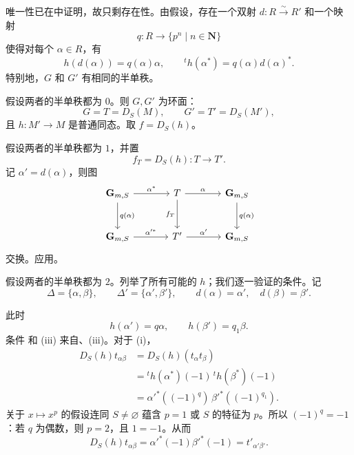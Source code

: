 


唯一性已在中证明，故只剩存在性。由假设，存在一个双射 \(d:R\xrightarrow{\sim}R'\) 和一个映射
\[
  q:R\longrightarrow\{p^n\mid n\in\mathbf N\}
\]
使得对每个 \(\alpha\in R\)，有
\[
  h(d(\alpha))=q(\alpha)\alpha,
  \qquad
  {}^th(\alpha^*)=q(\alpha)d(\alpha)^*.
\]
特别地，\(G\) 和 \(G'\) 有相同的半单秩。

假设两者的半单秩都为 \(0\)。则 \(G,G'\) 为环面：
\[
  G=T=D_S(M),\qquad G'=T'=D_S(M'),
\]
且 \(h:M'\to M\) 是普通同态。取 \(f=D_S(h)\)。

假设两者的半单秩都为 \(1\)，并置
\[
  f_T=D_S(h):T\longrightarrow T'.
\]
记 \(\alpha'=d(\alpha)\)，则图
\[
\begin{tikzcd}[column sep=large,row sep=large]
\mathbf G_{m,S}\ar[r,"\alpha^*"]\ar[d,"q(\alpha)"]
  &T\ar[r,"\alpha"]\ar[d,"f_T"']
  &\mathbf G_{m,S}\ar[d,"q(\alpha)"]\\
\mathbf G_{m,S}\ar[r,"\alpha'^*"]
  &T'\ar[r,"\alpha'"]
  &\mathbf G_{m,S}
\end{tikzcd}
\]
交换。应用。

假设两者的半单秩都为 \(2\)。列举了所有可能的 \(h\)；我们逐一验证的条件。记
\[
  \Delta=\{\alpha,\beta\},\qquad
  \Delta'=\{\alpha',\beta'\},\qquad
  d(\alpha)=\alpha',\quad d(\beta)=\beta'.
\]

此时
\[
  h(\alpha')=q\alpha,\qquad h(\beta')=q_1\beta.
\]
条件 和 (iii) 来自、(iii)。对于 (i)，
\[
\begin{aligned}
 D_S(h)t_{\alpha\beta}
  &=D_S(h)(t_\alpha t_\beta)\\
  &={}^th(\alpha^*)(-1)\,{}^th(\beta^*)(-1)\\
  &=\alpha'^*((-1)^q)\,\beta'^*((-1)^{q_1}).
\end{aligned}
\]
关于 \(x\mapsto x^p\) 的假设连同 \(S\ne\varnothing\) 蕴含 \(p=1\) 或 \(S\) 的特征为 \(p\)。所以 \((-1)^q=-1\)：若 \(q\) 为偶数，则 \(p=2\)，且 \(1=-1\)。从而
\[
  D_S(h)t_{\alpha\beta}
   =\alpha'^*(-1)\beta'^*(-1)=t'_{\alpha'\beta'}.
\]

